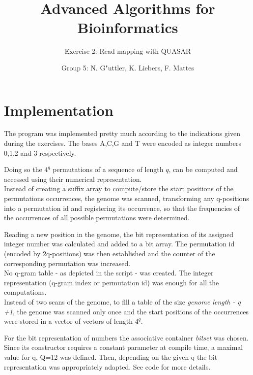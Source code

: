 \documentclass[11pt, notitlepage]{scrartcl}
\begin{document}
         


\title{Advanced Algorithms for Bioinformatics} 
\subtitle{Exercise 2: Read mapping with QUASAR}
\author{Group 5: N. G"uttler, K. Liebers, F. Mattes} %
\maketitle

\section{Implementation}
The program was implemented pretty much according to the indications given during the exercises. The bases A,C,G and T were encoded as integer numbers 0,1,2 and 3 respectively.

Doing so the $4^q$ permutations of a sequence of length $q$, can be computed and accessed using their numerical representation.\\ 
Instead of creating a suffix array to compute/store the start positions of the permutations occurrences, the genome was
scanned, transforming any q-positions into a permutation id and registering its occurrence, so that the frequencies of the occurrences of all possible permutations were determined.

Reading a new position in the genome, the bit representation of its assigned integer number was calculated and added to
a bit array.
The permutation id (encoded by 2q-positions) was then established and the counter of the corresponding permutation was increased. \\
No q-gram table - as depicted in the script - was created. The integer representation (q-gram index or permutation
id) was enough for all the computations.\\
Instead of two scans of the genome, to fill a table of the size \textit{genome length - q +1}, the genome was scanned
only once and the start positions of the occurrences were stored in a vector of vectors of length $4^q$.

For the bit representation of numbers the associative container \textit{bitset} was chosen. Since its constructor requires a constant parameter at compile time, a maximal value for q, Q=12 was defined. Then, depending on the given q the bit representation was appropriately adapted. 
See code for more details.   
\end{document}
